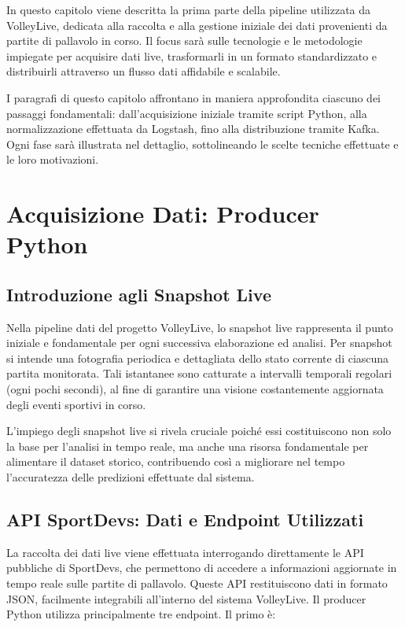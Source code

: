 \documentclass[a4paper,12pt]{report}
\begin{document}
In questo capitolo viene descritta la prima parte della pipeline utilizzata da VolleyLive, dedicata alla raccolta e alla gestione iniziale dei dati provenienti da partite di pallavolo in corso. Il focus sarà sulle tecnologie e le metodologie impiegate per acquisire dati live, trasformarli in un formato standardizzato e distribuirli attraverso un flusso dati affidabile e scalabile.

I paragrafi di questo capitolo affrontano in maniera approfondita ciascuno dei passaggi fondamentali: dall'acquisizione iniziale tramite script Python, alla normalizzazione effettuata da Logstash, fino alla distribuzione tramite Kafka. Ogni fase sarà illustrata nel dettaglio, sottolineando le scelte tecniche effettuate e le loro motivazioni.

\section{Acquisizione Dati: Producer Python}

\subsection{Introduzione agli Snapshot Live}

Nella pipeline dati del progetto VolleyLive, lo snapshot live rappresenta il punto iniziale e fondamentale per ogni successiva elaborazione ed analisi. Per snapshot si intende una fotografia periodica e dettagliata dello stato corrente di ciascuna partita monitorata. Tali istantanee sono catturate a intervalli temporali regolari (ogni pochi secondi), al fine di garantire una visione costantemente aggiornata degli eventi sportivi in corso.

L’impiego degli snapshot live si rivela cruciale poiché essi costituiscono non solo la base per l’analisi in tempo reale, ma anche una risorsa fondamentale per alimentare il dataset storico, contribuendo così a migliorare nel tempo l’accuratezza delle predizioni effettuate dal sistema.


\subsection{API SportDevs: Dati e Endpoint Utilizzati}

La raccolta dei dati live viene effettuata interrogando direttamente le API pubbliche di SportDevs, che permettono di accedere a informazioni aggiornate in tempo reale sulle partite di pallavolo. Queste API restituiscono dati in formato JSON, facilmente integrabili all'interno del sistema VolleyLive.
Il producer Python utilizza principalmente tre endpoint. Il primo è:
\end{document}
